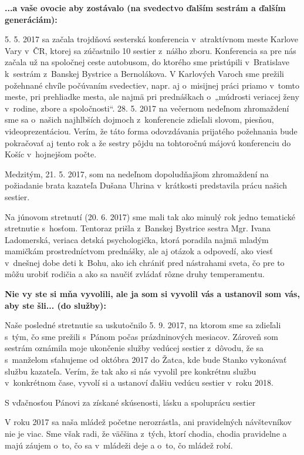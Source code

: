 {\bf ...a vaše ovocie aby zostávalo (na svedectvo ďalším sestrám a ďalším generáciám):}

5. 5. 2017 sa začala trojdňová sesterská konferencia v~atraktívnom meste Karlove Vary v~ČR, ktorej sa zúčastnilo 10 sestier z~nášho zboru. Konferencia sa pre nás začala už na spoločnej ceste autobusom, do ktorého sme pristúpili v~Bratislave k~sestrám z~Banskej Bystrice a Bernolákova. V Karlových Varoch sme prežili požehnané chvíle počúvaním svedectiev, napr. aj o~misijnej práci priamo v~tomto meste, pri prehliadke mesta, ale najmä pri prednáškach o~„múdrosti veriacej ženy v~rodine, zbore a spoločnosti“. 28. 5. 2017 na večernom nedeľnom zhromaždení sme sa o~našich najhlbších dojmoch z~konferencie zdieľali slovom, piesňou, videoprezentáciou. Verím, že táto forma odovzdávania prijatého požehnania bude pokračovať aj tento rok a že sestry pôjdu na tohtoročnú májovú konferenciu do Košíc v~hojnejšom počte.

Medzitým, 21. 5. 2017, som na nedeľnom dopoludňajšom zhromaždení na požiadanie brata kazateľa Dušana Uhrina v~krátkosti predstavila prácu našich sestier.

Na júnovom stretnutí (20. 6. 2017) sme mali tak ako minulý rok jedno tematické stretnutie s~hosťom. Tentoraz prišla z~Banskej Bystrice sestra Mgr. Ivana Ladomerská, veriaca detská psychologička, ktorá poradila najmä mladým mamičkám prostredníctvom prednášky, ale aj otázok a odpovedí, ako viesť v~dnešnej dobe deti k~Bohu, ako ich chrániť pred nástrahami sveta, čo pre to môžu urobiť rodičia a ako sa naučiť zvládať rôzne druhy temperamentu.

{\bf Nie vy ste si mňa vyvolili, ale ja som si vyvolil vás a ustanovil som vás, aby ste šli... (do služby):}

Naše posledné stretnutie sa uskutočnilo 5. 9. 2017, na ktorom sme sa zdieľali s~tým, čo sme prežili s~Pánom počas prázdninových mesiacov. Zároveň som sestrám oznámila moje ukončenie služby vedúcej sestier z~dôvodu, že sa s~manželom sťahujeme od októbra 2017 do Žatca, kde bude Stanko vykonávať službu kazateľa. Verím, že tak ako si nás vyvolil pre konkrétnu službu v~konkrétnom čase, vyvolí si a ustanoví ďalšiu vedúcu sestier v~roku 2018.

S vďačnosťou Pánovi za získané skúsenosti, lásku a spoluprácu sestier



V roku 2017 sa naša mládež početne nerozrástla, ani pravidelných návštevníkov nie je viac. Sme však radi, že väčšina z~tých, ktorí chodia, chodia pravidelne a majú záujem o~to, čo sa v~mládeži deje a o~to, čo mládež robí.

